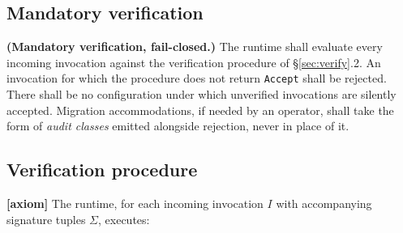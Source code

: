 \documentclass[11pt,a4paper]{article}
\newcommand{\axiom}{\textcolor{axiomcolor}{\textbf{[axiom]}}\xspace}
\begin{document}
\subsection{Mandatory verification}

\begin{invariant}
\textbf{(Mandatory verification, fail-closed.)} The runtime shall
evaluate every incoming invocation against the verification procedure
of \S\ref{sec:verify}.2. An invocation for which the procedure does
not return \texttt{Accept} shall be rejected. There shall be no
configuration under which unverified invocations are silently
accepted. Migration accommodations, if needed by an operator, shall
take the form of \emph{audit classes} emitted alongside rejection,
never in place of it.
\end{invariant}

\subsection{Verification procedure}

\axiom{} The runtime, for each incoming invocation $I$ with
accompanying signature tuples $\Sigma$, executes:
\end{document}
